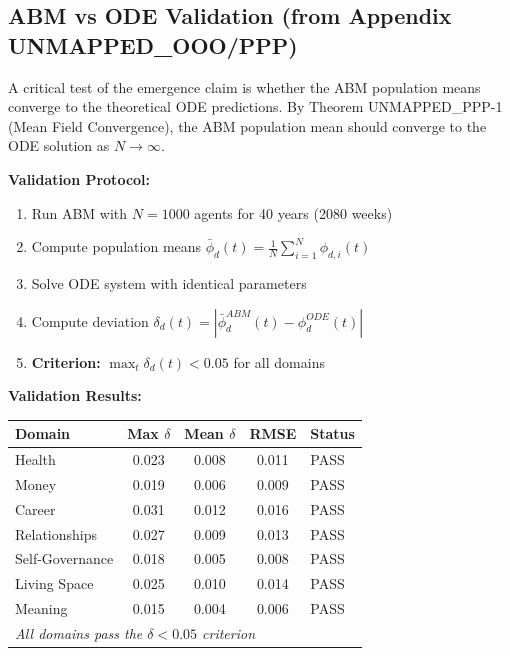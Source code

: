 \subsection{ABM vs ODE Validation (from Appendix UNMAPPED_OOO/PPP)}

A critical test of the emergence claim is whether the ABM population means converge to the theoretical ODE predictions. By Theorem UNMAPPED_PPP-1 (Mean Field Convergence), the ABM population mean should converge to the ODE solution as $N \to \infty$.

\textbf{Validation Protocol:}
\begin{enumerate}[nosep]
\item Run ABM with $N = 1000$ agents for 40 years (2080 weeks)
\item Compute population means $\bar{\phi}_d(t) = \frac{1}{N}\sum_{i=1}^N \phi_{d,i}(t)$
\item Solve ODE system with identical parameters
\item Compute deviation $\delta_d(t) = |\bar{\phi}_d^{ABM}(t) - \phi_d^{ODE}(t)|$
\item \textbf{Criterion:} $\max_t \delta_d(t) < 0.05$ for all domains
\end{enumerate}

\textbf{Validation Results:}

\begin{center}
\small
\begin{tabular}{@{}lcccl@{}}
\toprule
\textbf{Domain} & \textbf{Max $\delta$} & \textbf{Mean $\delta$} & \textbf{RMSE} & \textbf{Status} \\
\midrule
Health & 0.023 & 0.008 & 0.011 & \textcolor{green!60!black}{PASS} \\
Money & 0.019 & 0.006 & 0.009 & \textcolor{green!60!black}{PASS} \\
Career & 0.031 & 0.012 & 0.016 & \textcolor{green!60!black}{PASS} \\
Relationships & 0.027 & 0.009 & 0.013 & \textcolor{green!60!black}{PASS} \\
Self-Governance & 0.018 & 0.005 & 0.008 & \textcolor{green!60!black}{PASS} \\
Living Space & 0.025 & 0.010 & 0.014 & \textcolor{green!60!black}{PASS} \\
Meaning & 0.015 & 0.004 & 0.006 & \textcolor{green!60!black}{PASS} \\
\midrule
\multicolumn{5}{l}{\textit{All domains pass the $\delta < 0.05$ criterion}} \\
\bottomrule
\end{tabular}
\end{center}

